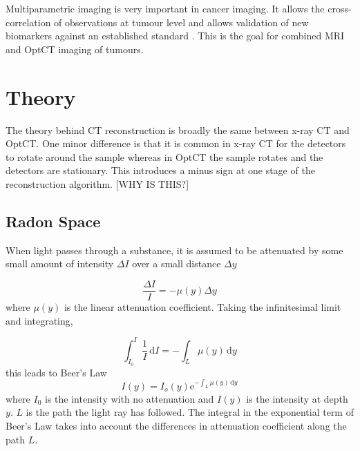 \documentclass[12pt]{article}
\begin{document}

Multiparametric imaging is very important in cancer imaging. It allows the cross-correlation of observations at tumour level and allows validation of new biomarkers against an established standard \cite{Padhani:2010hfa}. This is the goal for combined MRI and OptCT imaging of tumours. 

\newpage
\section{Theory}
\label{sec:theory}

The theory behind CT reconstruction is broadly the same between x-ray CT and OptCT. One minor difference is that it is common in x-ray CT for the detectors to rotate around the sample whereas in OptCT the sample rotates and the detectors are stationary. This introduces a minus sign at one stage of the reconstruction algorithm. [WHY IS THIS?]



\subsection{Radon Space}

When light passes through a substance, it is assumed to be attenuated by some small amount of intensity $\Delta I$ over a small distance $\Delta y$ 

\begin{equation}
\dfrac{\Delta I}{I} = -\mu(y)\Delta y
\end{equation}
where $\mu(y)$ is the linear attenuation coefficient.
Taking the infinitesimal limit and integrating, 

\begin{equation}
\int_{I_0}^{I} \frac{1}{I}\, \mathrm{d}I = - \int_L \mu(y)\, \mathrm{d}y
\end{equation}
this leads to Beer's Law 
\begin{equation}
I(y) = I_{o}(y)\mathrm{e}^{-\int_L \mu(y)\, \mathrm{d}y}
\label{eq:Beer}
\end{equation}
where $I_0$ is the intensity with no attenuation and $I(y)$ is the intensity at depth $y$. $L$ is the path the light ray has followed. The integral in the exponential term of Beer's Law takes into account the differences in attenuation coefficient along the path $L$. 
\end{document}
